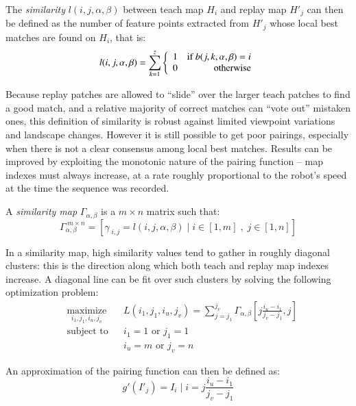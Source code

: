 \documentclass[twocolumn, 9pt,fleqn]{jsproceedings}
\begin{document}
The \textit{similarity} $l(i, j, \alpha, \beta)$ between teach map $H_i$ and replay map $H'_j$ can then be defined as the number of feature points extracted from $H'_j$ whose local best matches are found on  $H_i$, that is:
\begin{equation}
l(i, j, \alpha, \beta) = \sum_{k = 1}^{z} {
\left\{
\begin{array}{r r}
1 & \text{if } b(j, k, \alpha, \beta) = i \\
0 & \text{otherwise}
\end{array}
\right.
}
\end{equation}

Because replay patches are allowed to ``slide'' over the larger teach patches to find a good match, and a relative majority of correct matches can ``vote out'' mistaken ones, this definition of similarity is robust against limited viewpoint variations and landscape changes. However it is still possible to get poor pairings, especially when there is not a clear consensus among local best matches. Results can be improved by exploiting the monotonic nature of the pairing function -- map indexes must always increase, at a rate roughly proportional to the robot's speed at the time the sequence was recorded.

A \textit{similarity map} $\Gamma_{\alpha,\beta}$ is a $m \times n$ matrix such that:
\begin{equation}
\Gamma^{\; m \times n}_{\alpha,\beta} = [\gamma_{\; i,j} = l(i, j, \alpha, \beta) \; | \; i \in [1, m] \; , \; j \in [1, n]]
\end{equation}

In a similarity map, high similarity values tend to gather in roughly diagonal clusters: this is the direction along which both teach and replay map indexes increase. A diagonal line can be fit over such clusters by solving the following optimization problem:
\begin{equation}
\begin{aligned}
& \underset{i_1, j_1, i_u, j_v}{\text{maximize}}
& & L(i_1, j_1, i_u, j_v) = \sum_{j = j_1}^{j_v}{\Gamma_{\alpha,\beta}[j \frac{i_u - i_1}{j_v - j_1}, j]} \\
& \text{subject to}
& & i_1 = 1 \text{ or } j_1 = 1 \\
&
& & i_u = m \text{ or } j_v = n
\end{aligned}
\end{equation}

An approximation of the pairing function can then be defined as:
\begin{equation}
g'(I'_j) = I_i \; | \; i = j \frac{i_u - i_1}{j_v - j_1}
\end{equation}
\end{document}
